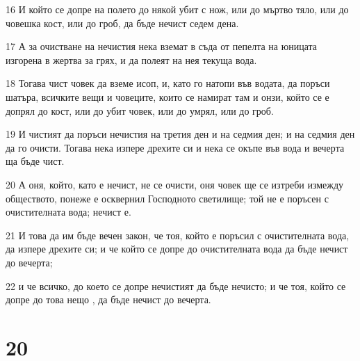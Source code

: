 \par 16 И който се допре на полето до някой убит с нож, или до мъртво тяло, или до човешка кост, или до гроб, да бъде нечист седем дена.
\par 17 А за очистване на нечистия нека вземат в съда от пепелта на юницата изгорена в жертва за грях, и да полеят на нея текуща вода.
\par 18 Тогава чист човек да вземе исоп, и, като го натопи във водата, да поръси шатъра, всичките вещи и човеците, които се намират там и онзи, който се е допрял до кост, или до убит човек, или до умрял, или до гроб.
\par 19 И чистият да поръси нечистия на третия ден и на седмия ден; и на седмия ден да го очисти. Тогава нека изпере дрехите си и нека се окъпе във вода и вечерта ща бъде чист.
\par 20 А оня, който, като е нечист, не се очисти, оня човек ще се изтреби измежду обществото, понеже е осквернил Господното светилище; той не е поръсен с очистителната вода; нечист е.
\par 21 И това да им бъде вечен закон, че тоя, който е поръсил с очистителната вода, да изпере дрехите си; и че който се допре до очистителната вода да бъде нечист до вечерта;
\par 22 и че всичко, до което се допре нечистият да бъде нечисто; и че тоя, който се допре до това нещо , да бъде нечист до вечерта.

\chapter{20}

